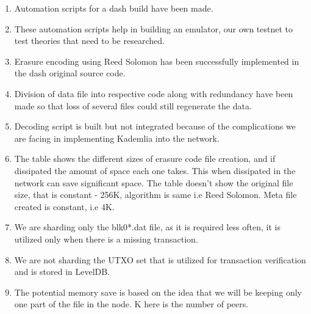 \documentclass[conference]{IEEEtran}
\begin{document}
\begin{enumerate}
    \item Automation scripts for a dash build have been made.
    \item These automation scripts help in building an emulator, our own testnet to test
        theories that need to be researched.
    \item Erasure encoding using Reed Solomon has been successfully implemented in the 
        dash original source code.
    \item Division of data file into respective code along with redundancy have been made
        so that loss of several files could still regenerate the data.
    \item Decoding script is built but not integrated because of the complications we are 
        facing in implementing Kademlia into the network.
    \item The table shows the different sizes of erasure code file creation, and if dissipated
        the amount of space each one takes. This when dissipated in the network can save significant space.
        The table doesn't show the original file size, that is constant - 256K, algorithm is same i.e Reed Solomon.
        Meta file created is constant, i.e 4K.

    \item We are sharding only the blk0*.dat file, as it is required less often, it is utilized only when there
        is a missing transaction.
    \item We are not sharding the UTXO set that is utilized for transaction verification and is stored in LevelDB.
    \item The potential memory save is based on the idea that we will be keeping only one part of the file in the node.
        K here is the number of peers.
\end{enumerate}
\end{document}
